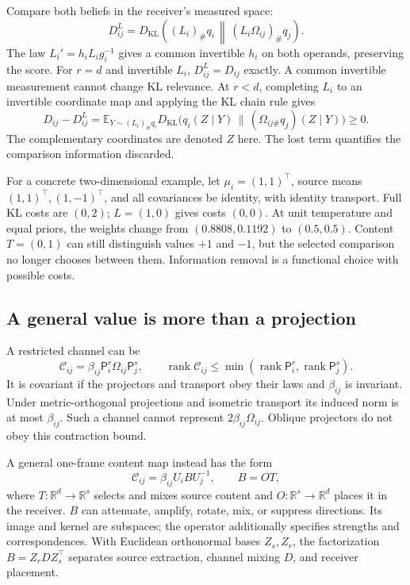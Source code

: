 \documentclass[11pt,letterpaper]{article}
\newcommand{\R}{\mathbb R}
\newcommand{\KL}{D_{\mathrm{KL}}}
\newcommand{\rank}{\operatorname{rank}}
\newcommand{\E}{\mathbb E}
\theoremstyle{remark}
\begin{document}
Compare both beliefs in the receiver's measured space:
\begin{equation}
 D^L_{ij}=\KL\left((L_i)_\#q_i\,
 \middle\|\,(L_i\Omega_{ij})_\#q_j\right).
 \label{eq:projected}
\end{equation}
The law $L_i'=h_iL_ig_i^{-1}$ gives a common invertible $h_i$ on both operands, preserving the score. For $r=d$ and invertible $L_i$, $D^L_{ij}=D_{ij}$ exactly. A common invertible measurement cannot change KL relevance. At $r<d$, completing $L_i$ to an invertible coordinate map and applying the KL chain rule gives
\begin{equation}
 D_{ij}-D^L_{ij}
 =\E_{Y\sim(L_i)_\#q_i}
 \KL\big(q_i(Z\mid Y)\,\|\,(\Omega_{ij\#}q_j)(Z\mid Y)\big)\ge0.
 \label{eq:lost-kl}
\end{equation}
The complementary coordinates are denoted $Z$ here. The lost term quantifies the comparison information discarded.

For a concrete two-dimensional example, let $\mu_i=(1,1)^\top$, source means $(1,1)^\top,(1,-1)^\top$, and all covariances be identity, with identity transport. Full KL costs are $(0,2)$; $L=(1,0)$ gives costs $(0,0)$. At unit temperature and equal priors, the weights change from $(0.8808,0.1192)$ to $(0.5,0.5)$. Content $T=(0,1)$ can still distinguish values $+1$ and $-1$, but the selected comparison no longer chooses between them. Information removal is a functional choice with possible costs.

\subsection{A general value is more than a projection}
A restricted channel can be
\begin{equation}
 \mathcal C_{ij}=\beta_{ij}\mathsf P_i^{r}\Omega_{ij}\mathsf P_j^{s},
 \qquad
 \rank\mathcal C_{ij}\le
 \min(\rank\mathsf P_i^r,\rank\mathsf P_j^s).
 \label{eq:restricted-channel}
\end{equation}
It is covariant if the projectors and transport obey their laws and $\beta_{ij}$ is invariant. Under metric-orthogonal projections and isometric transport its induced norm is at most $\beta_{ij}$. Such a channel cannot represent $2\beta_{ij}\Omega_{ij}$. Oblique projectors do not obey this contraction bound.

A general one-frame content map instead has the form
\begin{equation}
 \mathcal C_{ij}=\beta_{ij}U_iBU_j^{-1},\qquad B=OT,
 \label{eq:body-content}
\end{equation}
where $T:\R^d\to\R^s$ selects and mixes source content and $O:\R^s\to\R^d$ places it in the receiver. $B$ can attenuate, amplify, rotate, mix, or suppress directions. Its image and kernel are subspaces; the operator additionally specifies strengths and correspondences. With Euclidean orthonormal bases $Z_s,Z_r$, the factorization $B=Z_rDZ_s^\top$ separates source extraction, channel mixing $D$, and receiver placement.
\end{document}
